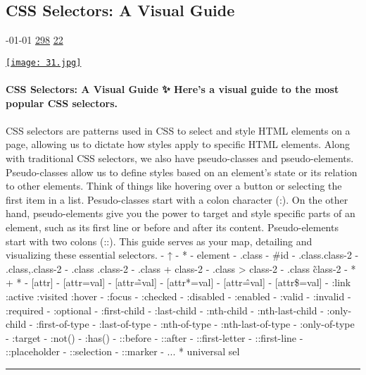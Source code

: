 \documentclass[10pt,a4paper]{article}
\begin{document}
\begin{multicols}{2}

\noindent\begin{minipage}{\linewidth}
\subsection{CSS Selectors: A Visual Guide}
\textsc{\footnotesize
{\scriptsize\faCalendar}-01-01 
{\scriptsize\faThumbsOUp}\space 
\href{http://news.ycombinator.com/item?id=37132754\&utm\_term=comment}{298} 
{\scriptsize\faComments}\space 
\href{http://news.ycombinator.com/item?id=37132754\&utm\_term=comment}{22} 
}
\par\medskip\noindent
\href{https://fffuel.co/css-selectors/?utm\_source=hackernewsletter\&utm\_medium=email\&utm\_term=design}{
    \texttt{[image: 31.jpg]}
}
\end{minipage}
\paragraph{}
\textbf{CSS Selectors: A Visual Guide
✨ Here's a visual guide to the most popular CSS selectors.}
\paragraph{}

CSS selectors are patterns used in CSS to select and style HTML elements on a page, allowing us to dictate how styles apply to specific HTML elements.
Along with traditional CSS selectors, we also have pseudo-classes and pseudo-elements. Pseudo-classes allow us to define styles based on an element's state or its relation to other elements. Think of things like hovering over a button or selecting the first item in a list. Pesudo-classes start with a colon character (:).
On the other hand, pseudo-elements give you the power to target and style specific parts of an element, such as its first line or before and after its content. Pseudo-elements start with two colons (::).
This guide serves as your map, detailing and visualizing these essential selectors.
- ↑
- *
- element
- .class
- \#id
- .class.class-2
- .class,.class-2
- .class .class-2
- .class + class-2
- .class > class-2
- .class \~ class-2
- * + *
- [attr]
- [attr=val]
- [attr\~=val]
- [attr*=val]
- [attr\^=val]
- [attr\$=val]
- :link :active :visited :hover
- :focus
- :checked
- :disabled
- :enabled
- :valid
- :invalid
- :required
- :optional
- :first-child
- :last-child
- :nth-child
- :nth-last-child
- :only-child
- :first-of-type
- :last-of-type
- :nth-of-type
- :nth-last-of-type
- :only-of-type
- :target
- :not()
- :has()
- ::before
- ::after
- ::first-letter
- ::first-line
- ::placeholder
- ::selection
- ::marker
- ...
* universal sel
\par\noindent\textcolor{red}{\rule{\linewidth}{0.2mm}}
\vfill
\null
\noindent\begin{minipage}{\linewidth}

\end{minipage}
\end{multicols}
\end{document}
